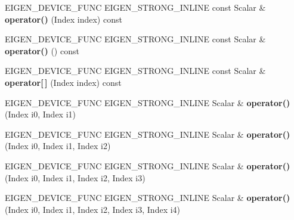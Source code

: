 \begin{DoxyCompactItemize}
\item 
\mbox{\label{class_eigen_1_1_tensor_fixed_size_a8241ef50e8831bc0187214ab14283d0e}} 
E\+I\+G\+E\+N\+\_\+\+D\+E\+V\+I\+C\+E\+\_\+\+F\+U\+NC E\+I\+G\+E\+N\+\_\+\+S\+T\+R\+O\+N\+G\+\_\+\+I\+N\+L\+I\+NE const Scalar \& {\bfseries operator()} (Index index) const
\item 
\mbox{\label{class_eigen_1_1_tensor_fixed_size_a1cd33848d1ac865e5fcda56f8baeae2f}} 
E\+I\+G\+E\+N\+\_\+\+D\+E\+V\+I\+C\+E\+\_\+\+F\+U\+NC E\+I\+G\+E\+N\+\_\+\+S\+T\+R\+O\+N\+G\+\_\+\+I\+N\+L\+I\+NE const Scalar \& {\bfseries operator()} () const
\item 
\mbox{\label{class_eigen_1_1_tensor_fixed_size_a9a4d0421ac1c5e689dc96241ff2c7f1b}} 
E\+I\+G\+E\+N\+\_\+\+D\+E\+V\+I\+C\+E\+\_\+\+F\+U\+NC E\+I\+G\+E\+N\+\_\+\+S\+T\+R\+O\+N\+G\+\_\+\+I\+N\+L\+I\+NE const Scalar \& {\bfseries operator\mbox{[}$\,$\mbox{]}} (Index index) const
\item 
\mbox{\label{class_eigen_1_1_tensor_fixed_size_a1117e4cf49231ccbc373a51be7b12085}} 
E\+I\+G\+E\+N\+\_\+\+D\+E\+V\+I\+C\+E\+\_\+\+F\+U\+NC E\+I\+G\+E\+N\+\_\+\+S\+T\+R\+O\+N\+G\+\_\+\+I\+N\+L\+I\+NE Scalar \& {\bfseries operator()} (Index i0, Index i1)
\item 
\mbox{\label{class_eigen_1_1_tensor_fixed_size_a16d88f4f1fa3d5667e8c84b00f0d60e9}} 
E\+I\+G\+E\+N\+\_\+\+D\+E\+V\+I\+C\+E\+\_\+\+F\+U\+NC E\+I\+G\+E\+N\+\_\+\+S\+T\+R\+O\+N\+G\+\_\+\+I\+N\+L\+I\+NE Scalar \& {\bfseries operator()} (Index i0, Index i1, Index i2)
\item 
\mbox{\label{class_eigen_1_1_tensor_fixed_size_af44f61a0fbf62ac53f98bc829a6d6491}} 
E\+I\+G\+E\+N\+\_\+\+D\+E\+V\+I\+C\+E\+\_\+\+F\+U\+NC E\+I\+G\+E\+N\+\_\+\+S\+T\+R\+O\+N\+G\+\_\+\+I\+N\+L\+I\+NE Scalar \& {\bfseries operator()} (Index i0, Index i1, Index i2, Index i3)
\item 
\mbox{\label{class_eigen_1_1_tensor_fixed_size_af6510afbaa532c90e154b54ca5190e58}} 
E\+I\+G\+E\+N\+\_\+\+D\+E\+V\+I\+C\+E\+\_\+\+F\+U\+NC E\+I\+G\+E\+N\+\_\+\+S\+T\+R\+O\+N\+G\+\_\+\+I\+N\+L\+I\+NE Scalar \& {\bfseries operator()} (Index i0, Index i1, Index i2, Index i3, Index i4)

\end{DoxyCompactItemize}
